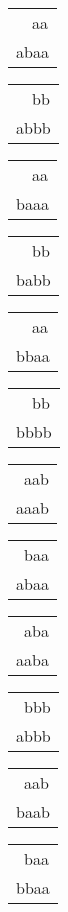 \begin{tabular}{|l|} \hline
\ \ aa \\
abaa \\
\hline
\end{tabular} 
\begin{tabular}{|l|} \hline
\ \ bb \\
abbb \\
\hline
\end{tabular} 
\begin{tabular}{|l|} \hline
\ \ aa \\
baaa \\
\hline
\end{tabular} 
\begin{tabular}{|l|} \hline
\ \ bb \\
babb \\
\hline
\end{tabular} 
\begin{tabular}{|l|} \hline
\ \ aa \\
bbaa \\
\hline
\end{tabular} 
\begin{tabular}{|l|} \hline
\ \ bb \\
bbbb \\
\hline
\end{tabular} 
\begin{tabular}{|l|} \hline
\ aab \\
aaab \\
\hline
\end{tabular} 
\begin{tabular}{|l|} \hline
\ baa \\
abaa \\
\hline
\end{tabular} 
\begin{tabular}{|l|} \hline
\ aba \\
aaba \\
\hline
\end{tabular} 
\begin{tabular}{|l|} \hline
\ bbb \\
abbb \\
\hline
\end{tabular} 
\begin{tabular}{|l|} \hline
\ aab \\
baab \\
\hline
\end{tabular} 
\begin{tabular}{|l|} \hline
\ baa \\
bbaa \\
\hline
\end{tabular} 
